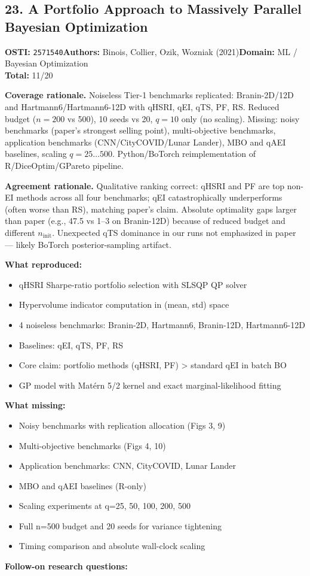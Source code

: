 \subsection{23. A Portfolio Approach to Massively Parallel Bayesian Optimization}
\textbf{OSTI:} \texttt{2571540}\quad\textbf{Authors:} Binois, Collier, Ozik, Wozniak (2021)\quad\textbf{Domain:} ML / Bayesian Optimization\\
\quad{}\quad\textbf{Total:} 11/20\par\smallskip
\noindent\textbf{Coverage rationale.} Noiseless Tier-1 benchmarks replicated: Branin-2D/12D and Hartmann6/Hartmann6-12D with qHSRI, qEI, qTS, PF, RS. Reduced budget ($n=200$ vs 500), 10 seeds vs 20, $q=10$ only (no scaling). Missing: noisy benchmarks (paper's strongest selling point), multi-objective benchmarks, application benchmarks (CNN/CityCOVID/Lunar Lander), MBO and qAEI baselines, scaling $q=25\ldots 500$. Python/BoTorch reimplementation of R/DiceOptim/GPareto pipeline.\par
\noindent\textbf{Agreement rationale.} Qualitative ranking correct: qHSRI and PF are top non-EI methods across all four benchmarks; qEI catastrophically underperforms (often worse than RS), matching paper's claim. Absolute optimality gaps larger than paper (e.g., 47.5 vs 1--3 on Branin-12D) because of reduced budget and different $n_\mathrm{init}$. Unexpected qTS dominance in our runs not emphasized in paper --- likely BoTorch posterior-sampling artifact.\par\smallskip
\noindent\textbf{What reproduced:}
\begin{itemize}[leftmargin=1.4em,itemsep=0.2em,topsep=0.2em]
\item qHSRI Sharpe-ratio portfolio selection with SLSQP QP solver
\item Hypervolume indicator computation in (mean, std) space
\item 4 noiseless benchmarks: Branin-2D, Hartmann6, Branin-12D, Hartmann6-12D
\item Baselines: qEI, qTS, PF, RS
\item Core claim: portfolio methods (qHSRI, PF) \textgreater{} standard qEI in batch BO
\item GP model with Mat\'ern 5/2 kernel and exact marginal-likelihood fitting
\end{itemize}\noindent\textbf{What missing:}
\begin{itemize}[leftmargin=1.4em,itemsep=0.2em,topsep=0.2em]
\item Noisy benchmarks with replication allocation (Figs 3, 9)
\item Multi-objective benchmarks (Figs 4, 10)
\item Application benchmarks: CNN, CityCOVID, Lunar Lander
\item MBO and qAEI baselines (R-only)
\item Scaling experiments at q=25, 50, 100, 200, 500
\item Full n=500 budget and 20 seeds for variance tightening
\item Timing comparison and absolute wall-clock scaling
\end{itemize}\noindent\textbf{Follow-on research questions:}
